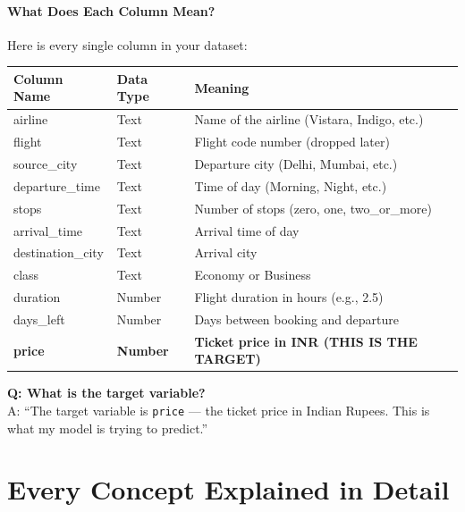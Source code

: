 \documentclass[12pt, a4paper]{article}
\begin{document}
\subsection{What Does Each Column Mean?}
Here is every single column in your dataset:

\begin{center}
\begin{tabular}{|l|l|l|}
    \hline
    \textbf{Column Name} & \textbf{Data Type} & \textbf{Meaning} \\
    \hline
    airline & Text & Name of the airline (Vistara, Indigo, etc.) \\
    flight & Text & Flight code number (dropped later) \\
    source\_city & Text & Departure city (Delhi, Mumbai, etc.) \\
    departure\_time & Text & Time of day (Morning, Night, etc.) \\
    stops & Text & Number of stops (zero, one, two\_or\_more) \\
    arrival\_time & Text & Arrival time of day \\
    destination\_city & Text & Arrival city \\
    class & Text & Economy or Business \\
    duration & Number & Flight duration in hours (e.g., 2.5) \\
    days\_left & Number & Days between booking and departure \\
    \textbf{price} & \textbf{Number} & \textbf{Ticket price in INR (THIS IS THE TARGET)} \\
    \hline
\end{tabular}
\end{center}

\begin{warnbox}
    \textbf{Q: What is the target variable?} \\
    A: ``The target variable is \texttt{price} — the ticket price in Indian Rupees. This is what my model is trying to predict.''
\end{warnbox}



\part{Every Concept Explained in Detail}
\end{document}
